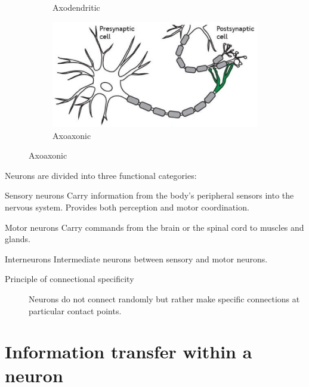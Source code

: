 \begin{descriptionlist}
\begin{figure}[H]
\begin{subfigure}{.3\textwidth}
            \caption{Axodendritic}
        \end{subfigure}
        \begin{subfigure}{.3\textwidth}
            \centering
            \includegraphics[width=\linewidth]{./img/axoaxonic.png}
            \caption{Axoaxonic}
        \end{subfigure}
    \end{figure}
\end{descriptionlist}

Neurons are divided into three functional categories:
\begin{descriptionlist}
    \item[Sensory neurons] 
        Carry information from the body's peripheral sensors into the nervous system.
        Provides both perception and motor coordination.

    \item[Motor neurons] 
        Carry commands from the brain or the spinal cord to muscles and glands.

    \item[Interneurons] 
        Intermediate neurons between sensory and motor neurons.
\end{descriptionlist}

\begin{description}
    \item[Principle of connectional specificity] 
        Neurons do not connect randomly but rather make specific connections at particular contact points.
\end{description}



\section{Information transfer within a neuron}


